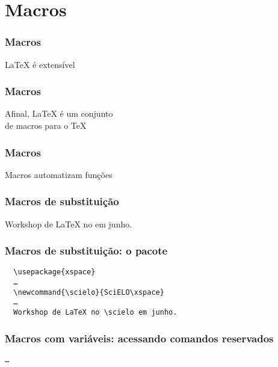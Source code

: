 \section{Macros}

\begin{frame}
  \frametitle{Macros}
  \LARGE
  \LaTeX{} é extensível
\end{frame}

\begin{frame}
  \frametitle{Macros}
  \LARGE
  Afinal, \LaTeX{} é um conjunto\\ de macros para o \TeX
\end{frame}

\begin{frame}
  \frametitle{Macros}
  \LARGE
  Macros automatizam funções
\end{frame}

\begin{frame}[fragile]
  \frametitle{Macros de substituição}
  \LARGE
  \texttt{\newcommand{\scielo}{SciELO}}
  \vspace{1em}

  Workshop de LaTeX no \texttt{\scielo{}} em junho.
\end{frame}

\begin{frame}[fragile]
  \frametitle{Macros de substituição: o pacote }
  \begin{verbatim}
  \usepackage{xspace}
  …
  \newcommand{\scielo}{SciELO\xspace}
  …
  Workshop de LaTeX no \scielo em junho.
  \end{verbatim}
\end{frame}


\begin{frame}
  \frametitle{Macros com variáveis: acessando comandos reservados}
  \LARGE
  \texttt{\makeatletter … \makeatother}
\end{frame}

